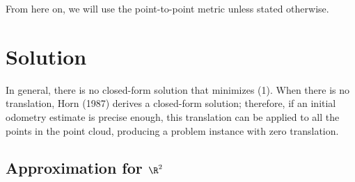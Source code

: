 \documentclass[12pt]{article}
\theoremstyle{defstyle}
\begin{document}
From here on, we will use the point-to-point metric unless stated otherwise.

\section{Solution}

In general, there is no closed-form solution that minimizes (1).
When there is no translation, Horn (1987) derives a closed-form solution; therefore, if an initial odometry estimate is precise enough, this translation can be applied to all the points in the point cloud, producing a problem instance with zero translation.

\subsection{Approximation for $\R^2$}
\end{document}
